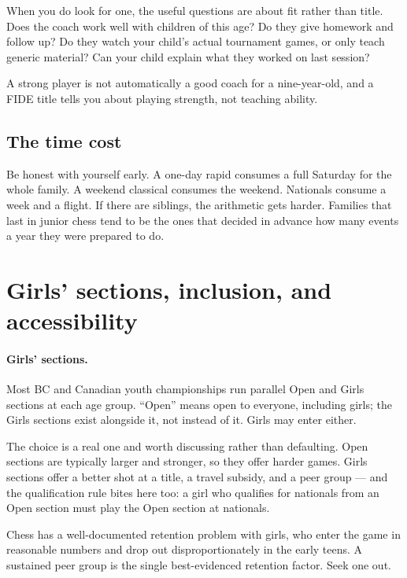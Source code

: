 \documentclass[10pt,letterpaper]{article}
\begin{document}
When you do look for one, the useful questions are about fit rather than title.
Does the coach work well with children of this age? Do they give homework and
follow up? Do they watch your child's actual tournament games, or only teach
generic material? Can your child explain what they worked on last session?

A strong player is not automatically a good coach for a nine-year-old, and a
FIDE title tells you about playing strength, not teaching ability.

\subsection{The time cost}

Be honest with yourself early. A one-day rapid consumes a full Saturday for the
whole family. A weekend classical consumes the weekend. Nationals consume a week
and a flight. If there are siblings, the arithmetic gets harder. Families that
last in junior chess tend to be the ones that decided in advance how many events
a year they were prepared to do.

\section{Girls' sections, inclusion, and accessibility}

\paragraph{Girls' sections.} Most BC and Canadian youth championships run
parallel Open and Girls sections at each age group. ``Open'' means open to
everyone, including girls; the Girls sections exist alongside it, not instead of
it. Girls may enter either.

The choice is a real one and worth discussing rather than defaulting. Open
sections are typically larger and stronger, so they offer harder games. Girls
sections offer a better shot at a title, a travel subsidy, and a peer group ---
and the qualification rule bites here too: a girl who qualifies for nationals
from an Open section must play the Open section at nationals.

Chess has a well-documented retention problem with girls, who enter the game in
reasonable numbers and drop out disproportionately in the early teens. A
sustained peer group is the single best-evidenced retention factor. Seek one out.
\end{document}
